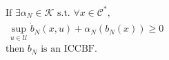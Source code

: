 \documentclass[preview]{standalone}
\begin{document}
\begin{align*}
&\text{If } \exists \alpha_N \in \mathcal{K} \text{ s.t. }\forall x \in \mathcal{C}^*,\\ &\ \sup_{u \in \mathcal{U}} \dot b_N(x, u) + \alpha_N(b_N(x)) \geq 0\\ &\text{then } b_N \text{ is an ICCBF.}
\end{align*}
\end{document}
